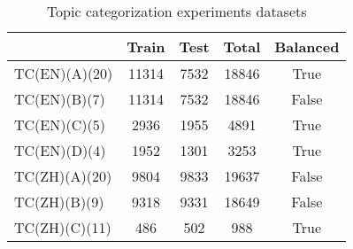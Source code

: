 \begin{table}[]
\centering
\caption{Topic categorization experiments datasets}
\begin{tabular}{|l|c|c|c|c|}
\hline
              & Train & Test & Total & Balanced \\ \hline
TC(EN)(A)(20) & 11314 & 7532 & 18846 & True     \\ \hline
TC(EN)(B)(7)  & 11314 & 7532 & 18846 & False    \\ \hline
TC(EN)(C)(5)  & 2936  & 1955 & 4891  & True     \\ \hline
TC(EN)(D)(4)  & 1952  & 1301 & 3253  & True     \\ \hline
TC(ZH)(A)(20) & 9804  & 9833 & 19637 & False    \\ \hline
TC(ZH)(B)(9)  & 9318  & 9331 & 18649 & False    \\ \hline
TC(ZH)(C)(11) & 486   & 502  & 988   & True     \\ \hline
\end{tabular}
\end{table}